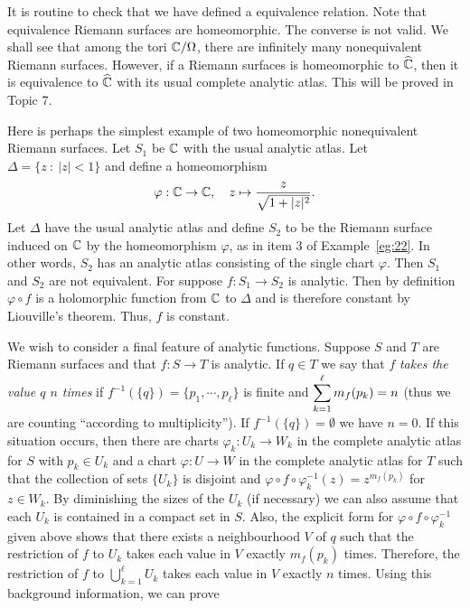 \documentclass[a4paper,11pt]{article}
\begin{document}
It is routine to check that we have defined a equivalence relation.
Note that equivalence Riemann surfaces are homeomorphic.  The converse
is not valid.  We shall see that among the tori ${\mathbb C}/\Omega$, there
are infinitely many nonequivalent Riemann surfaces.  However, if a
Riemann surfaces is homeomorphic to $\widehat{{\mathbb C}}$, then it is
equivalence to $\widehat{{\mathbb C}}$ with its usual complete analytic
atlas.  This will be proved in Topic 7.

Here is perhaps the simplest example of two homeomorphic nonequivalent
Riemann surfaces.  Let $S_1$ be ${\mathbb C}$ with the usual analytic atlas.
Let $\Delta = \{ z ~:~ |z| < 1\}$ and define a homeomorphism 
$$
\varphi : {\mathbb C} \to {\mathbb C},\quad
z \mapsto \frac{z}{\sqrt{1 + |z|^2}}.
$$
Let $\Delta$ have the usual analytic atlas and define $S_2$ to be the
Riemann surface induced on ${\mathbb C}$ by the homeomorphism $\varphi$, as
in item 3 of Example~\ref{eg:22}. In other words, $S_2$ has an
analytic atlas consisting of the single chart $\varphi$.  Then $S_1$
and $S_2$ are not equivalent.  For suppose $f : S_1 \to S_2$ is
analytic.  Then by definition $\varphi \circ f$ is a holomorphic
function from ${\mathbb C}$ to $\Delta$ and is therefore constant by
Liouville's theorem.  Thus, $f$ is constant.

We wish to consider a final feature of analytic functions.  Suppose
$S$ and $T$ are Riemann surfaces and that $f : S \to T$ is analytic.
If $q \in T$ we say that $f$ \emph{takes the value $q$ $n$ times} if
$f^{-1}(\{q\}) = \{p_1, \cdots, p_\ell\}$ is finite and
$\displaystyle
\sum_{k=1}^{\ell} m_f(p_k) = n
$
(thus we are counting ``according to multiplicity'').
If $f^{-1}(\{q\}) = \emptyset$ we have $n = 0$.  If this situation
occurs, then there are charts $\varphi_k : U_k \to W_k$ in the
complete analytic atlas for $S$ with $p_k \in U_k$ and a chart
$\varphi : U \to W$ in the complete analytic atlas for $T$ such that
the collection of sets $\{U_k\}$ is disjoint and $\varphi \circ f
\circ \varphi_k^{-1}(z) = z^{m_f(p_k)}$ for $z \in W_k$.  By
diminishing the sizes of the $U_k$ (if necessary) we can also assume
that each $U_k$ is contained in a compact set in $S$.  Also, the
explicit form for $\varphi \circ f \circ \varphi_k^{-1}$ given above
shows that there exists a neighbourhood $V$ of $q$ such that the
restriction of $f$ to $U_k$ takes each value in $V$ exactly $m_f(p_k)$
times.  Therefore, the restriction of $f$ to $\bigcup_{k=1}^\ell U_k$
takes each value in $V$ exactly $n$ times.  Using this background
information, we can prove
\end{document}
